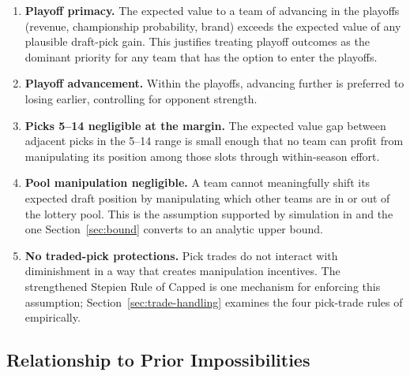 \begin{enumerate}
    \item \textbf{Playoff primacy.} The expected value to a team of advancing in the playoffs (revenue, championship probability, brand) exceeds the expected value of any plausible draft-pick gain. This justifies treating playoff outcomes as the dominant priority for any team that has the option to enter the playoffs.
    \item \textbf{Playoff advancement.} Within the playoffs, advancing further is preferred to losing earlier, controlling for opponent strength.
    \item \textbf{Picks 5--14 negligible at the margin.} The expected value gap between adjacent picks in the 5--14 range is small enough that no team can profit from manipulating its position among those slots through within-season effort.
    \item \textbf{Pool manipulation negligible.} A team cannot meaningfully shift its expected draft position by manipulating which other teams are in or out of the lottery pool. This is the assumption supported by simulation in \citep{highley2026cola} and the one Section~\ref{sec:bound} converts to an analytic upper bound.
    \item \textbf{No traded-pick protections.} Pick trades do not interact with diminishment in a way that creates manipulation incentives. The strengthened Stepien Rule of Capped \cola{} is one mechanism for enforcing this assumption; Section~\ref{sec:trade-handling} examines the four pick-trade rules of \citep{highley2026solvable4} empirically.
\end{enumerate}


\subsection{Relationship to Prior Impossibilities}
\label{sec:cola-impossibility}

